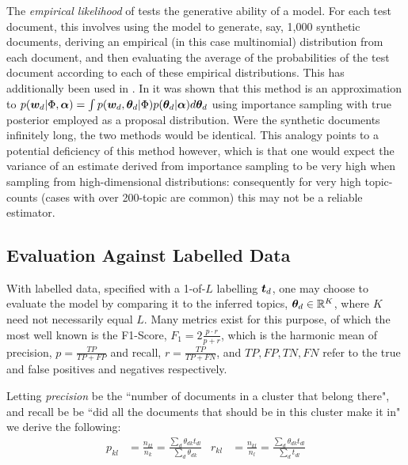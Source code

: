 
The \emph{empirical likelihood} of \cite{Li2006} tests the generative ability of a model. For each test document, this involves using the model to generate, say, 1,000 synthetic documents, deriving an empirical (in this case multinomial) distribution from each document, and then evaluating the average of the probabilities of the test document according to each of these empirical distributions. This has additionally been used in \cite{Doyle2009}\cite{Mimno2008}. In \cite{Wallach2009} it was shown that this method is an approximation to $p(\bm w_d|\Phi, \bm \alpha) = \int p(\bm w_d, { \bm \theta_d } | \Phi)p({ \bm \theta_d }|\bm \alpha)d{ \bm \theta_d }$ using importance sampling with true posterior employed as a proposal distribution. Were the synthetic documents infinitely long, the two methods would be identical. This analogy points to a potential deficiency of this method however, which is that one would expect the variance of an estimate derived from importance sampling to be very high when sampling from high-dimensional distributions: consequently for very high topic-counts (cases with over 200-topic are common) this may not be a reliable estimator.

\subsection*{Evaluation Against Labelled Data}
With labelled data, specified with a 1-of-$L$ labelling $\bm t_d$, one may choose to evaluate the model by comparing it to the inferred topics, ${ \bm \theta_d } \in { \mathbb{R}^{K} }$, where $K$ need not necessarily equal $L$. Many metrics exist for this purpose, of which the most well known is the F1-Score, $F_1 = 2 \frac{p \cdot r}{p + r}$, which is the harmonic mean of precision, $p=\frac{TP}{TP+FP}$ and recall, $r=\frac{TP}{TP+FN}$, and $TP, FP, TN, FN$ refer to the true and false positives and negatives respectively.


Letting \emph{precision} be the ``number of documents in a cluster that belong there", and recall be be ``did all the documents that should be in this cluster make it in" we derive the following:
\begin{align}
p_{kl} & = \frac{n_{kl}}{n_k} = \frac{\sum_d \theta_{dk} t_{dl}}{\sum_d \theta_{dk}}  & r_{kl} & = \frac{n_{kl}}{n_l} = \frac{\sum_d \theta_{dk} t_{dl}}{\sum_d t_{dl}} \label{eqn:myrecall}
\end{align}

